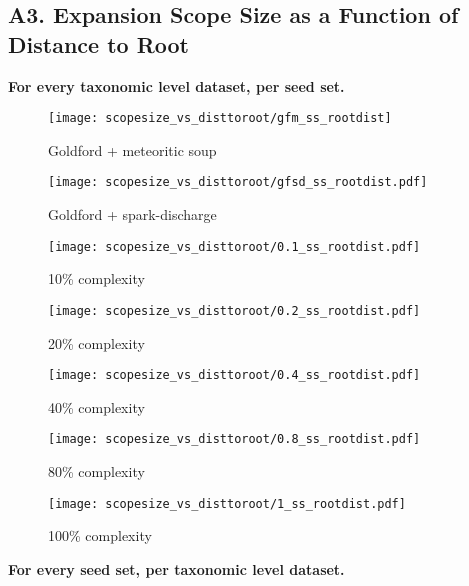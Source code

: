\newpage
\subsection*{A3. Expansion Scope Size as a Function of Distance to Root}
\textbf{For every taxonomic level dataset, per seed set.}

\begin{figure}[H]
    \centering
    \texttt{[image: scopesize\_vs\_disttoroot/gfm\_ss\_rootdist]}
    \caption{Goldford + meteoritic soup}
    \label{gfm_scopesize}
\end{figure}   

\begin{figure}[H]
    \centering
    \texttt{[image: scopesize\_vs\_disttoroot/gfsd\_ss\_rootdist.pdf]}
    \caption{Goldford + spark-discharge}
    \label{gfsd_scopesize}
\end{figure}   

\begin{figure}[H]
    \centering
    \texttt{[image: scopesize\_vs\_disttoroot/0.1\_ss\_rootdist.pdf]}
    \caption{10\% complexity}
    \label{0.1_scopesize}
\end{figure}   

\begin{figure}[H]
    \centering
    \texttt{[image: scopesize\_vs\_disttoroot/0.2\_ss\_rootdist.pdf]}
    \caption{20\% complexity}
    \label{0.2_scopesize}
\end{figure}   

\begin{figure}[H]
    \centering
    \texttt{[image: scopesize\_vs\_disttoroot/0.4\_ss\_rootdist.pdf]}
    \caption{40\% complexity}
    \label{0.4_scopesize}
\end{figure}   

\begin{figure}[H]
    \centering
    \texttt{[image: scopesize\_vs\_disttoroot/0.8\_ss\_rootdist.pdf]}
    \caption{80\% complexity}
    \label{0.8_scopesize}
\end{figure}   

\begin{figure}[H]
    \centering
    \texttt{[image: scopesize\_vs\_disttoroot/1\_ss\_rootdist.pdf]}
    \caption{100\% complexity}
    \label{1_scopesize}
\end{figure}   

\textbf{For every seed set, per taxonomic level dataset.}

